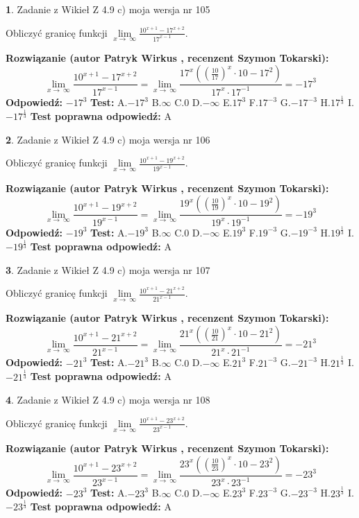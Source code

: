 \documentclass[12pt, a4paper]{article}
\theoremstyle{definition} %
\newtheorem{zad}{}
\newcommand{\zadStart}[1]{\begin{zad}#1\newline}
\newcommand{\zadStop}{\end{zad}}
\newcommand{\rozwStart}[2]{\noindent \textbf{Rozwiązanie (autor #1 , recenzent #2): }\newline}
\newcommand{\rozwStop}{\newline}
\newcommand{\odpStart}{\noindent \textbf{Odpowiedź:}\newline}
\newcommand{\odpStop}{\newline}
\newcommand{\testStart}{\noindent \textbf{Test:}\newline}
\newcommand{\testStop}{\newline}
\newcommand{\kluczStart}{\noindent \textbf{Test poprawna odpowiedź:}\newline}
\newcommand{\kluczStop}{\newline}
\begin{document}
\zadStart{Zadanie z Wikieł Z 4.9 c) moja wersja nr 105}


Obliczyć granicę funkcji  $\lim\limits_{x\to\ \infty}\frac{10^{x+1}-17^{x+2}}{17^{x-1}}$.
\zadStop
\rozwStart{Patryk Wirkus}{Szymon Tokarski}
$$\lim\limits_{x\to\ \infty}\frac{10^{x+1}-17^{x+2}}{17^{x-1}}=\lim\limits_{x\to\ \infty}\frac{17^{x}((\frac{10}{17})^{x}\cdot 10 -17^{2})}{17^{x}\cdot 17^{-1}} = -17^{3}$$
\rozwStop
\odpStart
$-17^{3}$
\odpStop
\testStart
A.$-17^{3}$ B.$\infty$ C.$0$ D.$-\infty$ E.$17^{3}$
F.$17^{-3}$ G.$-17^{-3}$
H.$17^{\frac{1}{3}}$
I.$-17^{\frac{1}{3}}$
\testStop
\kluczStart
A
\kluczStop



\zadStart{Zadanie z Wikieł Z 4.9 c) moja wersja nr 106}


Obliczyć granicę funkcji  $\lim\limits_{x\to\ \infty}\frac{10^{x+1}-19^{x+2}}{19^{x-1}}$.
\zadStop
\rozwStart{Patryk Wirkus}{Szymon Tokarski}
$$\lim\limits_{x\to\ \infty}\frac{10^{x+1}-19^{x+2}}{19^{x-1}}=\lim\limits_{x\to\ \infty}\frac{19^{x}((\frac{10}{19})^{x}\cdot 10 -19^{2})}{19^{x}\cdot 19^{-1}} = -19^{3}$$
\rozwStop
\odpStart
$-19^{3}$
\odpStop
\testStart
A.$-19^{3}$ B.$\infty$ C.$0$ D.$-\infty$ E.$19^{3}$
F.$19^{-3}$ G.$-19^{-3}$
H.$19^{\frac{1}{3}}$
I.$-19^{\frac{1}{3}}$
\testStop
\kluczStart
A
\kluczStop



\zadStart{Zadanie z Wikieł Z 4.9 c) moja wersja nr 107}


Obliczyć granicę funkcji  $\lim\limits_{x\to\ \infty}\frac{10^{x+1}-21^{x+2}}{21^{x-1}}$.
\zadStop
\rozwStart{Patryk Wirkus}{Szymon Tokarski}
$$\lim\limits_{x\to\ \infty}\frac{10^{x+1}-21^{x+2}}{21^{x-1}}=\lim\limits_{x\to\ \infty}\frac{21^{x}((\frac{10}{21})^{x}\cdot 10 -21^{2})}{21^{x}\cdot 21^{-1}} = -21^{3}$$
\rozwStop
\odpStart
$-21^{3}$
\odpStop
\testStart
A.$-21^{3}$ B.$\infty$ C.$0$ D.$-\infty$ E.$21^{3}$
F.$21^{-3}$ G.$-21^{-3}$
H.$21^{\frac{1}{3}}$
I.$-21^{\frac{1}{3}}$
\testStop
\kluczStart
A
\kluczStop



\zadStart{Zadanie z Wikieł Z 4.9 c) moja wersja nr 108}


Obliczyć granicę funkcji  $\lim\limits_{x\to\ \infty}\frac{10^{x+1}-23^{x+2}}{23^{x-1}}$.
\zadStop
\rozwStart{Patryk Wirkus}{Szymon Tokarski}
$$\lim\limits_{x\to\ \infty}\frac{10^{x+1}-23^{x+2}}{23^{x-1}}=\lim\limits_{x\to\ \infty}\frac{23^{x}((\frac{10}{23})^{x}\cdot 10 -23^{2})}{23^{x}\cdot 23^{-1}} = -23^{3}$$
\rozwStop
\odpStart
$-23^{3}$
\odpStop
\testStart
A.$-23^{3}$ B.$\infty$ C.$0$ D.$-\infty$ E.$23^{3}$
F.$23^{-3}$ G.$-23^{-3}$
H.$23^{\frac{1}{3}}$
I.$-23^{\frac{1}{3}}$
\testStop
\kluczStart
A
\kluczStop
\end{document}
